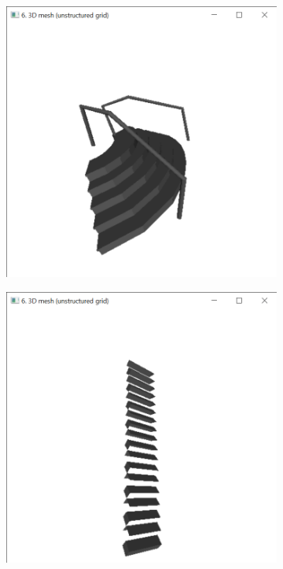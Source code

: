 \documentclass{bigdata}
\begin{document}
\begin{figure}[h!]
  \centering
  \begin{subfigure}[b]{0.2\linewidth}
    \includegraphics[width=\linewidth]{Pictures/Evaluation/staircaseClass/stair1.png}
  \end{subfigure}
  \begin{subfigure}[b]{0.2\linewidth}
    \includegraphics[width=\linewidth]{Pictures/Evaluation/staircaseClass/stair2.png}

\end{subfigure}
\end{figure}
\end{document}
